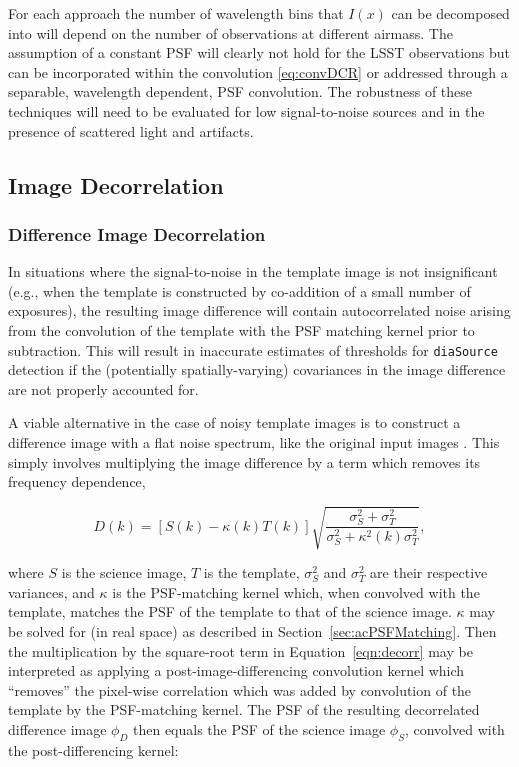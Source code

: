 For each approach the number of wavelength bins that $I(x)$ can be decomposed into will depend on the number of observations at different airmass. The assumption of a constant PSF will clearly not hold for the LSST observations but can be incorporated within the convolution \autoref{eq:convDCR} or addressed through a separable, wavelength dependent, PSF convolution. The robustness of these techniques will need to be evaluated for low signal-to-noise sources and in the presence of scattered light and artifacts.

\subsection{Image Decorrelation}
\label{sec:acImageDecorrelation}
\subsubsection{Difference Image Decorrelation}
\label{sec:acDiffImDecorrelation}

In situations where the signal-to-noise in the template image is not insignificant (e.g., when the template is constructed by co-addition of a small number of exposures), the resulting image difference will contain autocorrelated noise arising from the convolution of the template with the PSF matching kernel prior to subtraction. This will result in inaccurate estimates of thresholds for \texttt{diaSource} detection if the (potentially spatially-varying) covariances in the image difference are not properly accounted for.

A viable alternative in the case of noisy template images is to construct a difference image with a flat noise spectrum, like the original input images \citep{Kaiser04, 2016ApJ...830...27Z}. This simply involves multiplying the image difference by a term which removes its frequency dependence,

\begin{equation}
  D(k) = \left[S(k) - \kappa(k) T(k)\right]\sqrt{\frac{\sigma_S^2+\sigma_T^2}{\sigma_S^2 + \kappa^2(k)\sigma_T^2}},
  \label{eqn:decorr}
\end{equation}

\noindent
where $S$ is the science image, $T$ is the template, $\sigma_S^2$ and $\sigma_T^2$ are their respective variances, and $\kappa$ is the PSF-matching kernel which, when convolved with the template, matches the PSF of the template to that of the science image. $\kappa$ may be solved for (in real space) as described in Section~\ref{sec:acPSFMatching}. Then the multiplication by the square-root term in Equation~\ref{eqn:decorr} may be interpreted as applying a post-image-differencing convolution kernel which ``removes'' the pixel-wise correlation which was added by convolution of the template by the PSF-matching kernel. The PSF of the resulting decorrelated difference image $\phi_D$ then equals the PSF of the science image $\phi_S$, convolved with the post-differencing kernel:

